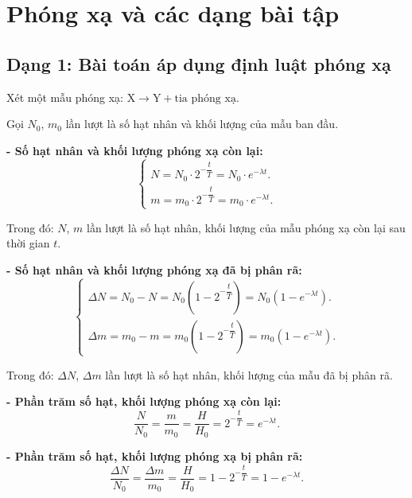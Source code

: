 \chapter{Phóng xạ và các dạng bài tập}
\section{Dạng 1: Bài toán áp dụng định luật phóng xạ}
Xét một mẫu phóng xạ: $\text{X} \longrightarrow \text{Y} + \text{tia phóng xạ}$.

Gọi $N_0$, $m_0$  lần lượt là số hạt nhân và khối lượng của mẫu ban đầu.

\textbf{- Số hạt nhân và khối lượng phóng xạ còn lại:}
\begin{equation}
	\begin{cases}
		N = N_0 \cdot 2^{-\dfrac{t}{T}} = N_0 \cdot e^{-\lambda t}.\\
		m=m_0 \cdot 2^{-\dfrac{t}{T}} = m_0\cdot e^{-\lambda t}. 
	\end{cases}
\end{equation}

Trong đó: $N$, $m$ lần lượt là số hạt nhân, khối lượng của mẫu phóng xạ còn lại sau thời gian $t$.

\textbf{- Số hạt nhân và khối lượng phóng xạ đã bị phân rã:}
\begin{equation}
	\begin{cases}
		\Delta N = N_0 - N = N_0 \left (1-2^{-\dfrac{t}{T}}\right) = N_0 (1-e^{-\lambda t}).\\
		\Delta m=m_0-m=m_0 \left(1-2^{-\dfrac{t}{T}}\right)= m_0(1-e^{-\lambda t}).
	\end{cases}
\end{equation}

Trong đó: $\Delta N$, $\Delta m$  lần lượt là số hạt nhân, khối lượng của mẫu đã bị phân rã.

\textbf{- Phần trăm số hạt, khối lượng phóng xạ còn lại:}  
\begin{equation}
	\dfrac{N}{N_0} =\dfrac{m}{m_0} = \dfrac{H}{H_0} = 2^{-\dfrac{t}{T}} = e^{-\lambda t}.
\end{equation}

\textbf{- Phần trăm số hạt, khối lượng phóng xạ bị phân rã: }
\begin{equation}
	\dfrac{\Delta N}{N_0} =\dfrac{\Delta m}{m_0} = \dfrac{H}{H_0} = 1- 2^{-\dfrac{t}{T}} = 1- e^{-\lambda t}.
\end{equation}

